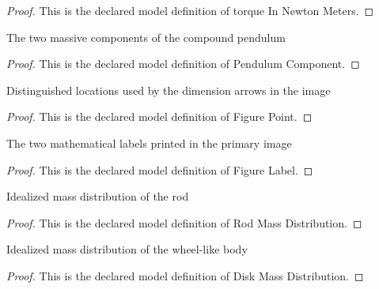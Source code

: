 \begin{proof}
  This is the declared model definition of torque In Newton Meters.
\end{proof}
\begin{definition}
  \label{def:physics:phyx-mini-0262:phyxminiproblems-problemphyxmini0262-pendulumcomponent}
  The two massive components of the compound pendulum
\end{definition}
\begin{proof}
  This is the declared model definition of Pendulum Component.
\end{proof}
\begin{definition}
  \label{def:physics:phyx-mini-0262:phyxminiproblems-problemphyxmini0262-figurepoint}
  Distinguished locations used by the dimension arrows in the image
\end{definition}
\begin{proof}
  This is the declared model definition of Figure Point.
\end{proof}
\begin{definition}
  \label{def:physics:phyx-mini-0262:phyxminiproblems-problemphyxmini0262-figurelabel}
  The two mathematical labels printed in the primary image
\end{definition}
\begin{proof}
  This is the declared model definition of Figure Label.
\end{proof}
\begin{definition}
  \label{def:physics:phyx-mini-0262:phyxminiproblems-problemphyxmini0262-rodmassdistribution}
  Idealized mass distribution of the rod
\end{definition}
\begin{proof}
  This is the declared model definition of Rod Mass Distribution.
\end{proof}
\begin{definition}
  \label{def:physics:phyx-mini-0262:phyxminiproblems-problemphyxmini0262-diskmassdistribution}
  Idealized mass distribution of the wheel-like body
\end{definition}
\begin{proof}
  This is the declared model definition of Disk Mass Distribution.
\end{proof}
